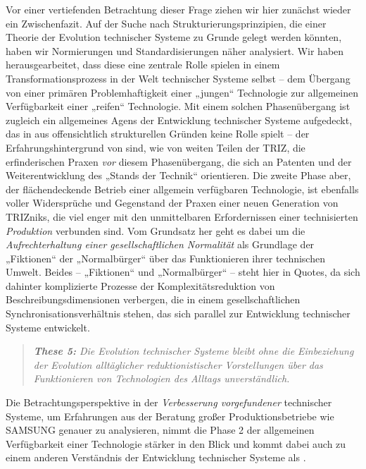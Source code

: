 \documentclass[11pt,a4paper]{article}
\begin{document}
Vor einer vertiefenden Betrachtung dieser Frage ziehen wir hier zunächst
wieder ein Zwischenfazit.  Auf der Suche nach Strukturierungsprinzipien, die
einer Theorie der Evolution technischer Systeme zu Grunde gelegt werden
könnten, haben wir Normierungen und Standardisierungen näher analysiert. Wir
haben herausgearbeitet, dass diese eine zentrale Rolle spielen in einem
Transformationsprozess in der Welt technischer Systeme selbst -- dem Übergang
von einer primären Problemhaftigkeit einer „jungen“ Technologie zur
allgemeinen Verfügbarkeit einer „reifen“ Technologie.  Mit einem solchen
Phasenübergang ist zugleich ein allgemeines Agens der Entwicklung technischer
Systeme aufgedeckt, das in \cite{TESE2018} aus offensichtlich strukturellen
Gründen keine Rolle spielt -- der Erfahrungshintergrund von \cite{TESE2018}
sind, wie von weiten Teilen der TRIZ, die erfinderischen Praxen \emph{vor}
diesem Phasenübergang, die sich an Patenten und der Weiterentwicklung des
„Stands der Technik“ orientieren.  Die zweite Phase aber, der flächendeckende
Betrieb einer allgemein verfügbaren Technologie, ist ebenfalls voller
Widersprüche und Gegenstand der Praxen einer neuen Generation von TRIZniks,
die viel enger mit den unmittelbaren Erfordernissen einer technisierten
\emph{Produktion} verbunden sind.  Vom Grundsatz her geht es dabei um die
\emph{Aufrechterhaltung einer gesellschaftlichen Normalität} als Grundlage der
„Fiktionen“ der „Normalbürger“ über das Funktionieren ihrer technischen
Umwelt.  Beides -- „Fiktionen“ und „Normalbürger“ -- steht hier in Quotes, da
sich dahinter komplizierte Prozesse der Komplexitätsreduktion von
Beschreibungsdimensionen verbergen, die in einem gesellschaftlichen
Synchronisationsverhältnis stehen, das sich parallel zur Entwicklung
technischer Systeme entwickelt.
\begin{quote}\it
  \textbf{These 5:} Die Evolution technischer Systeme bleibt ohne die
  Einbeziehung der Evolution alltäglicher reduktionistischer Vorstellungen
  über das Funktionieren von Technologien des Alltags unverständlich.   
\end{quote}

Die Betrachtungsperspektive in \cite{Shpakovsky2010} der \emph{Verbesserung
  vorgefundener} technischer Systeme, um Erfahrungen aus der Beratung großer
Produktionsbetriebe wie SAMSUNG genauer zu analysieren, nimmt die Phase 2 der
allgemeinen Verfügbarkeit einer Technologie stärker in den Blick und kommt
dabei auch zu einem anderen Verständnis der Entwicklung technischer Systeme
als \cite{TESE2018}.
\end{document}
